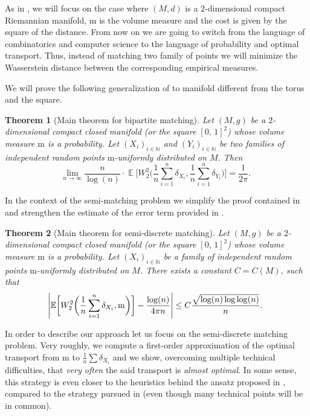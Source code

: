\documentclass[10pt]{amsart}
\theoremstyle{plain}
\newtheorem{theorem}[theorem]{Theorem}
\theoremstyle{definition}
\numberwithin{equation}{section}
\newcommand{\NN}{\ensuremath{\mathbb N}}
\newcommand{\bbE}[1]{\ensuremath{\operatorname{\mathbb{E}}\biggl[#1\biggr]}}
\newcommand{\cc}[2]{\ensuremath{\left[#1,\,#2\right]}}
\newcommand{\fullstop}{\ensuremath{\text{. }}}
\newcommand{\m}{\ensuremath{\mathrm m}}
\newcommand{\metric}{\ensuremath{g}}
\DeclarePairedDelimiter\abs{\lvert}{\rvert}
\begin{document}
As in \cite{Ambrosio-Stra-Trevisan2018}, we will focus on the case where $(M, d)$ is a $2$-dimensional
compact Riemannian manifold, $\m$ is the volume measure and the cost is given by the square of the distance.
From now on we are going to switch from the language of combinatorics and computer science to the
language of probability and optimal transport. Thus, instead of matching two family of points we will
minimize the Wasserstein distance between the corresponding empirical measures.

We will prove the following generalization of \cite[Eq.\,(1.2)]{Ambrosio-Stra-Trevisan2018}
to manifold different from the torus and the square.

\begin{theorem}[Main theorem for bipartite matching]\label{thm:main_theorem_bipartite}
Let $(M,\metric)$ be a $2$-dimensional compact closed manifold (or the square $\cc01^2$) whose
volume measure $\m$ is a probability.
Let $(X_i)_{i\in\NN}$ and $(Y_i)_{i\in\NN}$ be two families of independent random points
$\m$-uniformly distributed on $M$. Then\vspace*{-3pt}
\begin{equation*}
\lim_{n\to\infty} \frac{n}{\log(n)}\cdot
\bbE{W^2_2\biggl(\frac1n\sum_{i=1}^n\delta_{X_i}, \frac1n\sum_{i=1}^n\delta_{Y _i}\biggr)}
=\frac1{2\pi} \fullstop
\end{equation*}
\end{theorem}

In the context of the semi-matching problem we simplify
the proof contained in \cite{Ambrosio-Stra-Trevisan2018} and strengthen the estimate of the error
term provided in \cite{Ledoux18}.


\begin{theorem}[Main theorem for semi-discrete matching]\label{thm:main_theorem_semidiscrete}
Let $(M,\metric)$ be a $2$-dimen\-sion\-al compact closed manifold (or the square $\cc01^2$)
whose volume measure $\m$ is a probability.
Let $(X_i)_{i\in\NN}$ be a family of independent random points $\m$-uniformly distributed on $M$.
There exists a constant $C=C(M)$, such that
\begin{equation*}
\abs*{\bbE{W^2_2\biggl(\frac1n\sum_{i=1}^n\delta_{X_i}, \m\biggr)} - \frac{\log(n)}{4\pi n}}
\le C \frac{\sqrt{\log(n)\log\log(n)}}n \fullstop
\end{equation*}
\end{theorem}


In order to describe our approach let us focus on the semi-discrete matching problem.
Very roughly, we compute a first-order approximation of the optimal transport from $\m$ to
$\frac1n\sum \delta_{X_i}$ and we show, overcoming multiple technical difficulties, that \emph{very often}
the said transport is \emph{almost optimal}.
In some sense, this strategy is even closer to the
heuristics behind the ansatz proposed in \cite{CaraccioloEtAl2014}, compared to the strategy pursued in
\cite{Ambrosio-Stra-Trevisan2018} (even though many technical points will be in common).
\end{document}
